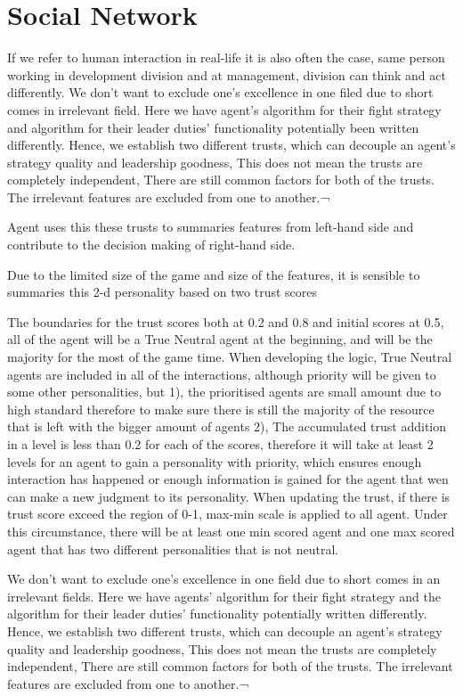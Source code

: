 \section{Social Network}
If we refer to human interaction in real-life it is also often the case, same person working in development division and at management, division can think and act differently. 
We don’t want to exclude one’s excellence in one filed due to short comes in irrelevant field.
Here we have agent’s algorithm for their fight strategy and algorithm for their leader duties’ functionality potentially been written differently. 
Hence, we establish two different trusts, which can decouple an agent’s strategy quality and leadership goodness, 
This does not mean the trusts are completely independent, 
There are still common factors for both of the trusts.
The irrelevant features are excluded from one to another.¬

Agent uses this these trusts to summaries features from left-hand side and contribute to the decision making of right-hand side. 

Due to the limited size of the game and size of the features, it is sensible to summaries this 2-d personality based on two trust scores

The boundaries for the trust scores both at 0.2 and 0.8 and initial scores at 0.5, all of the agent will be a True Neutral agent at the beginning, and will be the majority for the most of the game time. When developing the logic, True Neutral agents are included in all of the interactions, although priority will be given to some other personalities, but 1), the prioritised agents are small amount due to high standard therefore to make sure there is still the majority of the resource that is left with the bigger amount of agents 2), The accumulated trust addition in a level is less than 0.2 for each of the scores, therefore it will take at least 2 levels for an agent to gain a personality with priority, which ensures enough interaction has happened or enough information is gained for the agent that wen can make a new judgment to its personality. When updating the trust, if there is trust score exceed the region of 0-1, max-min scale is applied to all agent. Under this circumstance, there will be at least one min scored agent and one max scored agent that has two different personalities that is not neutral. 

We don’t want to exclude one’s excellence in one field due to short comes in an irrelevant fields.
Here we have agents’ algorithm for their fight strategy and the algorithm for their leader duties’ functionality potentially written differently. 
Hence, we establish two different trusts, which can decouple an agent’s strategy quality and leadership goodness, 
This does not mean the trusts are completely independent, 
There are still common factors for both of the trusts.
The irrelevant features are excluded from one to another.¬

